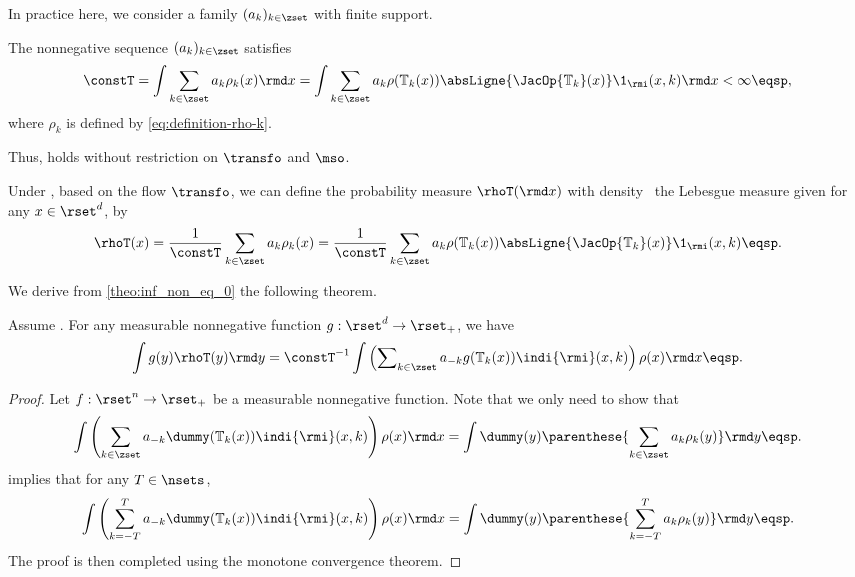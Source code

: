 In practice here, we consider a family $(a_k)_{k\in \zset} $ with finite support.

\begin{assumption}
  \label{assumption:z_ne_finite}
  The nonnegative sequence $(a_k)_{k\in\zset}$ satisfies
\begin{equation}
\label{eq:def_z_ne}
    \constT = \int\sum_{k\in \zset}  a_k \rho_k(x) \rmd x = \int\sum_{k\in \zset}  a_k \rho(\mathbb{T}_k(x))  \absLigne{\JacOp{\mathbb{T}_k}(x)} \1_{\rmi}(x,k) \rmd x< \infty\eqsp,
  \end{equation}
    where $\rho_k$ is defined by \eqref{eq:definition-rho-k}.
  \end{assumption}
  Thus, 
 holds without restriction on $\transfo$
  and $\mso$. 


   Under
  , based on the flow $\transfo$, we can define the probability measure
  $\rhoT(\rmd x)$ with density \wrt~the Lebesgue measure given for
  any $x \in \rset^d$, by
\begin{equation*}
    \rhoT(x) =  \frac{1}{\constT}\sum_{k \in \zset} a_k \rho_k(x)= \frac{1}{\constT} \sum_{k \in \zset} a_k \rho(\mathbb{T}_k(x))  \absLigne{\JacOp{\mathbb{T}_k}(x)} \1_{\rmi}(x,k)\eqsp.
  \end{equation*}
  
  We derive from \cref{theo:inf_non_eq_0} the following theorem.
  \begin{theorem}
 \label{theo:inf_non_eq}
 Assume .  For any measurable nonnegative function $g:\rset^d \to \rset_+$, we have
\begin{equation}
\label{eq:inf_non_eq_av}
  \int
g(y)     \rhoT(y) \rmd y  = \constT^{-1} \int \left(\sum\nolimits_{k\in\zset} a_{-k}g(\mathbb{T}_k(x)) \indi{\rmi}(x,k)  \right)\rho({x})\rmd x \eqsp.
\end{equation}
\end{theorem}
 
 \begin{proof}
 
Let $f:\rset^n \to \rset_+$ be a  measurable nonnegative function.  
Note that we only need to show that 
\begin{equation}
    \int \left(\sum_{k\in\zset} a_{-k}\dummy(\mathbb{T}_k(x)) \indi{\rmi}(x,k)  \right)\rho({x})\rmd x =\int
\dummy(y)     \parenthese{\sum_{k\in \zset} a_k  \rho_k(y)}\rmd y \eqsp.
\end{equation}
 implies that  for any $T \in \nsets$, 
\begin{equation}
    \label{eq:lemma_T_non_eq}
   \int \left(\sum_{k=-T}^T a_{-k}\dummy(\mathbb{T}_k(x)) \indi{\rmi}(x,k)  \right)\rho({x})\rmd x =\int
\dummy(y)     \parenthese{\sum_{k=-T}^T a_k  \rho_k(y)}\rmd y \eqsp.
\end{equation}
The proof is then
completed using the monotone convergence theorem.

\end{proof}
 
